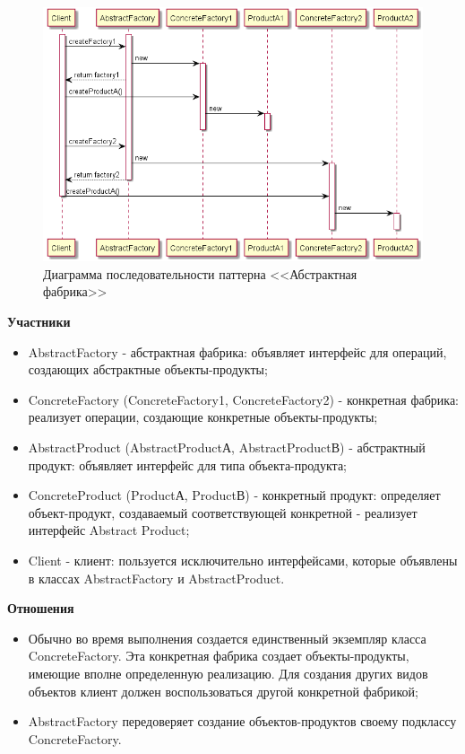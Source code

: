\documentclass[PI,LAB]{HSEUniversity}
\begin{document}
\begin{figure}[p]
  \centering
  \includegraphics[scale=0.6]{AF_SD.png}
  \caption{Диаграмма последовательности паттерна <<Абстрактная фабрика>>}
\end{figure}
\clearpage

\textbf{Участники}
\begin{itemize}
  \item AbstractFactory - абстрактная фабрика: объявляет интерфейс для операций, создающих абстрактные объекты-продукты;
  \item ConcreteFactory (ConcreteFactory1, ConcreteFactory2) - конкретная фабрика: реализует операции, создающие конкретные объекты-продукты;
  \item AbstractProduct (AbstractProductА, AbstractProductВ) - абстрактный продукт: объявляет интерфейс для типа объекта-продукта;
  \item ConcreteProduct (ProductА, ProductВ) - конкретный продукт: определяет объект-продукт, создаваемый соответствующей конкретной - реализует интерфейс Abstract Product;
  \item Client - клиент: пользуется исключительно интерфейсами, которые объявлены в классах AbstractFactory и AbstractProduct.
\end{itemize}

\textbf{Отношения}
\begin{itemize}
  \item Обычно во время выполнения создается единственный экземпляр класса ConcreteFactory. Эта конкретная фабрика создает объекты-продукты, имеющие вполне определенную реализацию. Для создания других видов объектов клиент должен воспользоваться другой конкретной фабрикой;
  \item AbstractFactory передоверяет создание объектов-продуктов своему подклассу ConcreteFactory.
\end{itemize}
\end{document}

